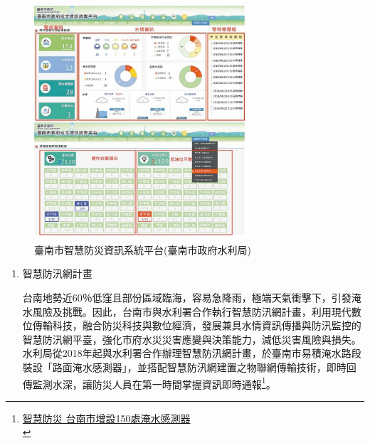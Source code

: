 \documentclass[a4paper,12pt]{article}
\begin{document}
\begin{enumerate}
\begin{figure}[htbp]
\centering
\includegraphics[width=300]{images/161637280435514_P7767413.jpg}
\caption{\label{fig:FigName}臺南市智慧防災資訊系統平台(臺南市政府水利局)}
\end{figure}
\begin{enumerate}
\item 智慧防汛網計畫
\label{sec:org98c85e0}

台南地勢近60％低窪且部份區域臨海，容易急降雨，極端天氣衝擊下，引發淹水風險及挑戰。因此，台南市與水利署合作執行智慧防汛網計畫，利用現代數位傳輸科技，融合防災科技與數位經濟，發展兼具水情資訊傳播與防汛監控的智慧防汛網平臺，強化市府水災災害應變與決策能力，減低災害風險與損失。水利局從2018年起與水利署合作辦理智慧防汛網計畫，於臺南市易積淹水路段裝設「路面淹水感測器」，並搭配智慧防汛網建置之物聯網傳輸技術，即時回傳監測水深，讓防災人員在第一時間掌握資訊即時通報\footnote{\href{https://www.chinatimes.com/realtimenews/20201204005753-260421?chdtv}{智慧防災 台南市增設150處淹水感測器}\\\label{org9d6627f}}。\\


\end{enumerate}
\end{enumerate}
\end{document}
